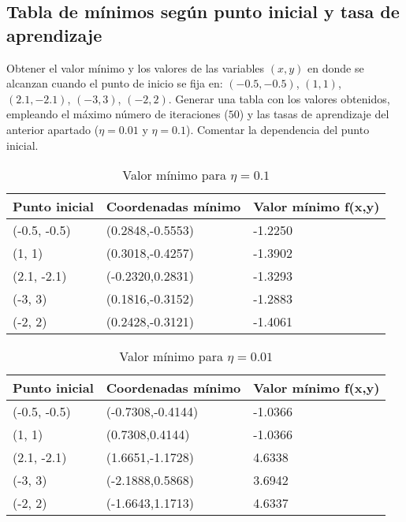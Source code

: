 

\subsection{Tabla de mínimos según punto inicial y tasa de aprendizaje}

Obtener el valor mínimo y los valores de las variables $(x, y)$ en donde se
alcanzan cuando el punto de inicio se fija en: $(-0.5, -0.5)$, $(1, 1)$, $(2.1,-2.1)$,
$(-3, 3)$, $(-2, 2)$.
Generar una tabla con los valores obtenidos, empleando el máximo número de
iteraciones ($50$) y las tasas de aprendizaje del anterior apartado ($\eta=0.01$ y 
$\eta = 0.1$). Comentar la dependencia del punto inicial.

\begin{table}[!ht]
    \caption {Valor mínimo para $\eta = 0.1$} \label{tab:title} 
    \centering
    \begin{tabular}{lll}
    \toprule
        Punto inicial & Coordenadas mínimo & Valor mínimo f(x,y) \\ \midrule
        (-0.5, -0.5) & (0.2848,-0.5553) & -1.2250 \\
        (1, 1) & (0.3018,-0.4257) & -1.3902 \\ 
        (2.1, -2.1) & (-0.2320,0.2831) & -1.3293 \\
        (-3, 3) & (0.1816,-0.3152) & -1.2883 \\
        (-2, 2) & (0.2428,-0.3121) & -1.4061 \\ \bottomrule
    \end{tabular}
\end{table}

\begin{table}[!ht]
    \caption {Valor mínimo para $\eta = 0.01$} \label{tab:title2} 
    \centering
    \begin{tabular}{lll}
    \toprule
        Punto inicial & Coordenadas mínimo & Valor mínimo f(x,y) \\ \midrule
        (-0.5, -0.5) & (-0.7308,-0.4144) & -1.0366 \\ 
        (1, 1) & (0.7308,0.4144) & -1.0366 \\ 
        (2.1, -2.1) & (1.6651,-1.1728) & 4.6338 \\ 
        (-3, 3) & (-2.1888,0.5868) & 3.6942 \\ 
        (-2, 2) & (-1.6643,1.1713) & 4.6337 \\ \bottomrule
    \end{tabular}
\end{table}

